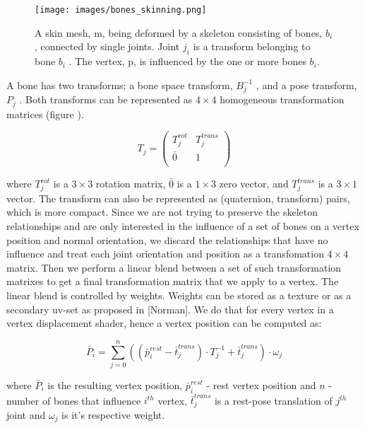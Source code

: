 \documentclass{acmsiggraph}
\begin{document}
\begin{figure}[ht]
  \centering
  \texttt{[image: images/bones\_skinning.png]}
  \caption{A skin mesh, m, being deformed by a skeleton consisting of bones, \(b_i\) , connected by single joints. Joint \(j_i\) is a transform belonging to bone \(b_i\) . The vertex, p, is influenced by the one or more bones \(b_i\).}
  \label{bones}
\end{figure}

A bone has two transforms; a bone space transform, \( B^{-1}_j\) , and a pose transform, \(P_j\) . Both transforms can be represented as \(4 \times 4\) homogeneous transformation matrices (figure \pageref{bones}).

\begin{equation} 
  T_j =
  \begin{pmatrix}
    T^{rot}_j & T^{trans}_j \\
    \bar 0 & 1 \\
  \end{pmatrix}
\end{equation} 

where $ T^{rot}_j$ is a $3 \times 3$ rotation matrix, $\bar 0$ is a $1 \times 3$ zero vector, and $T^{trans}_j$ is a $3 \times 1$ vector. The transform can also be represented as (quaternion, transform) pairs, which is more compact.
Since we are not trying to preserve the skeleton relationships and are only interested in the influence of a set of bones on a vertex position and normal orientation, we discard the relationships that have no influence and treat each joint orientation and position as a transfomation $4 \times 4$ matrix.  Then we perform a linear blend between a set of such transformation matrixes to get a final transformation matrix that we apply to a vertex.  The linear blend is controlled by weights.  Weights can be stored as a texture or as a secondary uv-set as proposed in [Norman]. We do that for every vertex in a vertex displacement shader, hence a vertex position can be computed as:

\begin{equation}
  \bar{P}_i = \sum^n_{j=0} ((\bar{p}^{rest}_i - \bar{t}^{trans}_j) \cdot T^{-1}_j + \bar{t}^{trans}_j) \cdot \omega_j
\end{equation}

where $\bar{P}_i$ is the resulting vertex position, $\bar{p}^{rest}_i$ - rest vertex position and $n$ - number of bones that influence $i^{th}$ vertex, $\bar{t}^{trans}_j$ is a rest-pose translation of $j^{th}$ joint and $\omega_j$ is it's respective weight.
\end{document}
